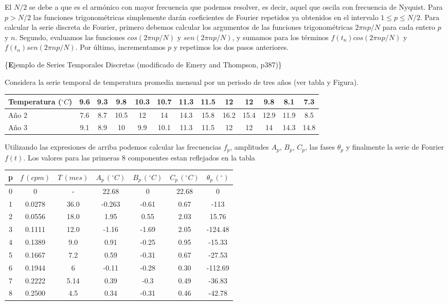 \documentclass[
]{agujournal2019}
\begin{document}
El \(N/2\) se debe a que es el armónico con mayor frecuencia que podemos
resolver, es decir, aquel que oscila con frecuencia de Nyquist. Para
\(p>N/2\) las funciones trigonométricas simplemente darán coeficientes
de Fourier repetidos ya obtenidos en el intervalo \(1\le p\le N/2\).
Para calcular la serie discreta de Fourier, primero debemos calcular los
argumentos de las funciones trigonométricas \(2\pi n p / N\) para cada
entero \(p\) y \(n\). Segundo, evaluamos las funciones
\(cos(2\pi n p / N)\) y \(sen(2\pi n p / N)\), y sumamos para los
términos \(f(t_n)cos(2\pi n p / N)\) y \(f(t_n)sen(2\pi n p / N)\). Por
último, incrementamos \(p\) y repetimos los dos pasos anteriores.

\vspace{0.5cm}

\{\textbf Ejemplo de Series Temporales Discretas (modificado de Emery
and Thompson, p387)\}

Considera la serie temporal de temperatura promedia mensual por un
periodo de tres años (ver tabla y Figura).\\

\begin{tabular}{|l|cccccccccccc|}

\hline
Temperatura ($^\circ C$) & 9.6 & 9.3 & 9.8 & 10.3 & 10.7 & 11.3 & 11.5 & 12 & 12 & 9.8 & 8.1 & 7.3\\
\hline
Año 2 & 7.6 & 8.7 & 10.5 & 12 & 14 & 14.3 & 15.8 & 16.2 & 15.4 & 12.9 & 11.9 & 8.5\\
\hline
Año 3 & 9.1 & 8.9 & 10 & 9.9 & 10.1 & 11.3 & 11.5 & 12 & 12 & 14 &14.3 & 14.8\\
\hline
\end{tabular}

\hfill\break

Utilizando las expresiones de arriba podemos calcular las frecuencias
\(f_p\), amplitudes \(A_p\), \(B_p\), \(C_p\), las fases \(\theta_p\) y
finalmente la serie de Fourier \(f(t)\). Los valores para las primeras 8
componentes estan reflejados en la tabla\\

\begin{center}
\begin{tabular}{c c c c c c c}
p & $f\,(cpm)$ & $T\,(mes)$ & $A_p\,(^\circ C)$ & $B_p\,(^\circ C)$ & $C_p\,(^\circ C)$ & $\theta_p\,(^\circ)$ \\
\hline
0 & 0 & - & 22.68 & 0 & 22.68 & 0\\
1 & 0.0278 & 36.0 & -0.263 & -0.61 & 0.67 & -113\\
2 & 0.0556 & 18.0 & 1.95 & 0.55 & 2.03 & 15.76\\
3 & 0.1111 & 12.0 & -1.16 & -1.69 & 2.05 & -124.48\\
4 & 0.1389 & 9.0 & 0.91 & -0.25 & 0.95 & -15.33\\
5 & 0.1667 & 7.2 & 0.59 & -0.31 & 0.67 & -27.53\\
6 & 0.1944 & 6 & -0.11 & -0.28 & 0.30 & -112.69\\
7 & 0.2222 & 5.14 & 0.39 & -0.3 & 0.49 & -36.83\\
8 & 0.2500 & 4.5 & 0.34 & -0.31 & 0.46 & -42.78\\
\end{tabular}
\end{center}
\end{document}

